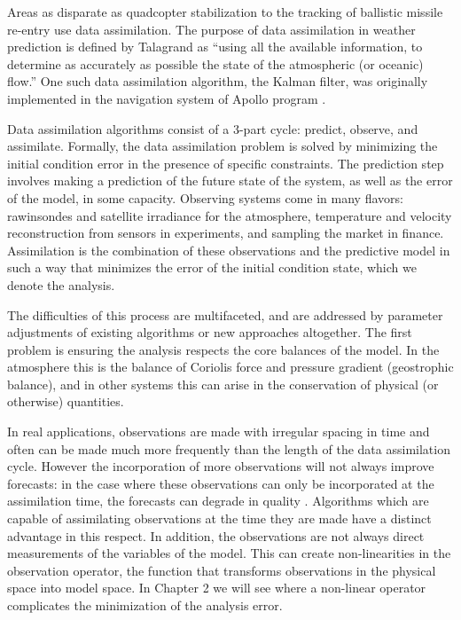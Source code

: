 Areas as disparate as quadcopter stabilization  to the tracking of ballistic missile re-entry  use data assimilation.
The purpose of data assimilation in weather prediction is defined by Talagrand as ``using all the available information, to determine as accurately as possible the state of the atmospheric (or oceanic) flow.'' 
One such data assimilation algorithm, the Kalman filter, was originally implemented in the navigation system of Apollo program .

Data assimilation algorithms consist of a 3-part cycle: predict, observe, and assimilate.
Formally, the data assimilation problem is solved by minimizing the initial condition error in the presence of specific constraints.
The prediction step involves making a prediction of the future state of the system, as well as the error of the model, in some capacity.
Observing systems come in many flavors: rawinsondes and satellite irradiance for the atmosphere, temperature and velocity reconstruction from sensors in experiments, and sampling the market in finance.
Assimilation is the combination of these observations and the predictive model in such a way that minimizes the error of the initial condition state, which we denote the analysis.

The difficulties of this process are multifaceted, and are addressed by parameter adjustments of existing algorithms or new approaches altogether.
The first problem is ensuring the analysis respects the core balances of the model.
In the atmosphere this is the balance of Coriolis force and pressure gradient (geostrophic balance), and in other systems this can arise in the conservation of physical (or otherwise) quantities.

In real applications, observations are made with irregular spacing in time and often can be made much more frequently than the length of the data assimilation cycle.
However the incorporation of more observations will not always improve forecasts: in the case where these observations can only be incorporated at the assimilation time, the forecasts can degrade in quality .
Algorithms which are capable of assimilating observations at the time they are made have a distinct advantage in this respect.
In addition, the observations are not always direct measurements of the variables of the model. 
This can create non-linearities in the observation operator, the function that transforms observations in the physical space into model space.
In Chapter 2 we will see where a non-linear operator complicates the minimization of the analysis error.

